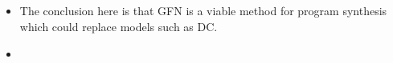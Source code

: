 \subsection{}
\begin{itemize}
    \item The conclusion here is that GFN is a viable method for program synthesis which could replace models such as DC. 
    \item 
\end{itemize}



































